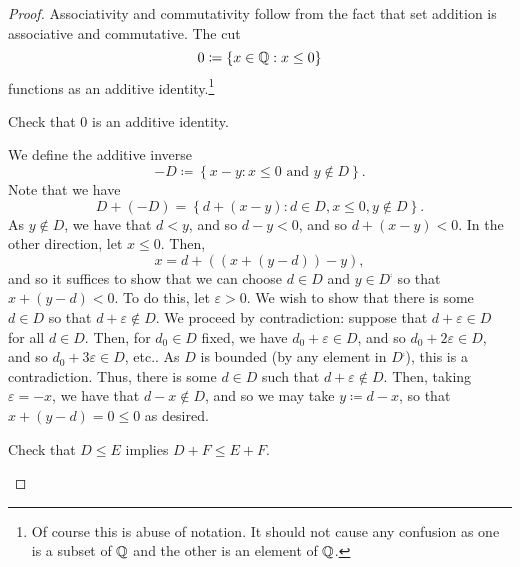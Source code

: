 \begin{thm}
\begin{proof}
\label{stp1.4.18.6}
Associativity and commutativity follow from the fact that set addition is associative and commutative.  The cut
\begin{equation}
0\coloneqq \left\{ x\in \mathbb{Q} :x\leq 0\right\}
\end{equation}
functions as an additive identity.\footnote{Of course this is abuse of notation.  It should not cause any confusion as one is a subset of $\mathbb{Q}$ and the other is an element of $\mathbb{Q}$.}
\begin{exr}
Check that $0$ is an additive identity.
\end{exr}
We define the additive inverse
\begin{equation}
-D\coloneqq \left\{ x-y:x\leq 0\text{ and }y\notin D\right\} .
\end{equation}
Note that we have
\begin{equation}
D+(-D)=\left\{ d+(x-y):d\in D,x\leq 0,y\notin D\right\} .
\end{equation}
As $y\notin D$, we have that $d<y$, and so $d-y<0$, and so $d+(x-y)<0$.  In the other direction, let $x\leq 0$.  Then,
\begin{equation}
x=d+\left( \left( x+(y-d)\right) -y\right) ,
\end{equation}
and so it suffices to show that we can choose $d\in D$ and $y\in D^{\comp}$ so that $x+(y-d)<0$.  To do this, let $\varepsilon >0$.  We wish to show that there is some $d\in D$ so that $d+\varepsilon \notin D$.  We proceed by contradiction:  suppose that $d+\varepsilon \in D$ for all $d\in D$.  Then, for $d_0\in D$ fixed, we have $d_0+\varepsilon \in D$, and so $d_0+2\varepsilon \in D$, and so $d_0+3\varepsilon \in D$, etc..  As $D$ is bounded (by any element in $D^{\comp}$), this is a contradiction.  Thus, there is some $d\in D$ such that $d+\varepsilon \notin D$.  Then, taking $\varepsilon =-x$, we have that $d-x\notin D$, and so we may take $y\coloneqq d-x$, so that $x+(y-d)=0\leq 0$ as desired.

\begin{exr}
Check that $D\leq E$ implies $D+F\leq E+F$.
\end{exr}


\end{proof}
\end{thm}
